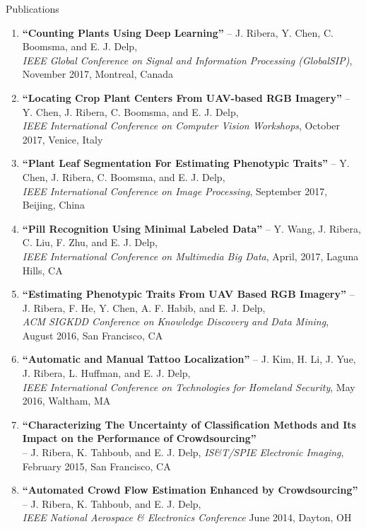 \documentclass{resume} %
\begin{document}
\begin{rSection}{Publications}

\footnotesize
\begin{enumerate}
\setlength{\itemindent}{-.1in}
\item 
\textbf{``Counting Plants Using Deep Learning''} -- J. Ribera, Y. Chen, C. Boomsma, and E. J. Delp, \\
		\emph{IEEE Global Conference on Signal and Information Processing (GlobalSIP)}, November 2017, Montreal, Canada
\item 
\textbf{``Locating Crop Plant Centers From UAV-based RGB Imagery''} -- Y. Chen, J. Ribera, C. Boomsma, and E. J. Delp, \\
		\emph{IEEE International Conference on Computer Vision Workshops}, October 2017, Venice, Italy
\item 
\textbf{``Plant Leaf Segmentation For Estimating Phenotypic Traits''} -- Y. Chen, J. Ribera, C. Boomsma, and E. J. Delp, \\
		\emph{IEEE International Conference on Image Processing}, September 2017, Beijing, China
\item 
\textbf{``Pill Recognition Using Minimal Labeled Data''} -- Y. Wang, J. Ribera, C. Liu, F. Zhu, and E. J. Delp, \\
		\emph{IEEE International Conference on Multimedia Big Data}, April, 2017, Laguna Hills, CA %
\item 
\textbf{``Estimating Phenotypic Traits From UAV Based RGB Imagery''} -- J. Ribera, F. He, Y. Chen, A. F. Habib, and E. J. Delp, \\
		\emph{ACM SIGKDD Conference on Knowledge Discovery and Data Mining}, August 2016, San Francisco, CA
\item 
\textbf{``Automatic and Manual Tattoo Localization''} -- J. Kim, H. Li, J. Yue, J. Ribera, L. Huffman, and E. J. Delp, \\
		\emph{IEEE International Conference on Technologies for Homeland Security}, May 2016, Waltham, MA %
\item 
\textbf{``Characterizing The Uncertainty of Classification Methods and Its Impact on the Performance of Crowdsourcing''} \\-- J. Ribera, K. Tahboub, and E. J. Delp, \emph{IS\&T/SPIE Electronic Imaging}, February 2015, San Francisco, CA %
\item 
\textbf{``Automated Crowd Flow Estimation Enhanced by Crowdsourcing''} -- J. Ribera, K. Tahboub, and E. J. Delp, \\
		\emph{IEEE National Aerospace \& Electronics Conference} June 2014, Dayton, OH %
\end{enumerate}


\end{rSection}
\end{document}
